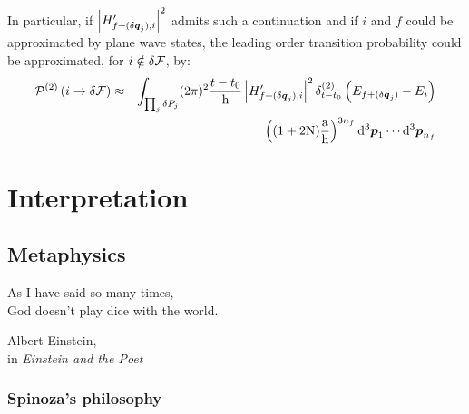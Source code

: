 \documentclass[10pt,a4paper,twoside,openany]{book}
\begin{document}
In particular, if $\left| H'_{f + (\delta \q_j),i} \right|^2$ admits such a continuation and if $i$ and $f$ could be approximated by plane wave states, the leading order transition probability could be approximated, for $i \notin \delta \F$, by:
\begin{eqnarray*}
\TPn i {\delta \F} 2 & \approx & \int_{\prod_j \delta P_j} ( 2 \pi )^2 \frac{t - t_0} \h \left| H'_{f + (\delta \q_j),i} \right|^2 \deltaE2{E_{f + (\delta \q_j)} - E_i} \\
&& \left( (1 + 2 \N) \frac \a \h \right)^{3 n_f} \dtp_1 \dotsm \dtp_{n_f}
\end{eqnarray*}

\part{Interpretation}

\chapter{Metaphysics}
\label{Metaphysics}

\renewcommand{\epigraphwidth}{6cm}
\epigraph{As I have said so many times,\\God doesn't play dice with the world.}{Albert Einstein, \\ in \textit{Einstein and the Poet}~\cite{Hermanns1983}}

\section{Spinoza's philosophy}
\end{document}
